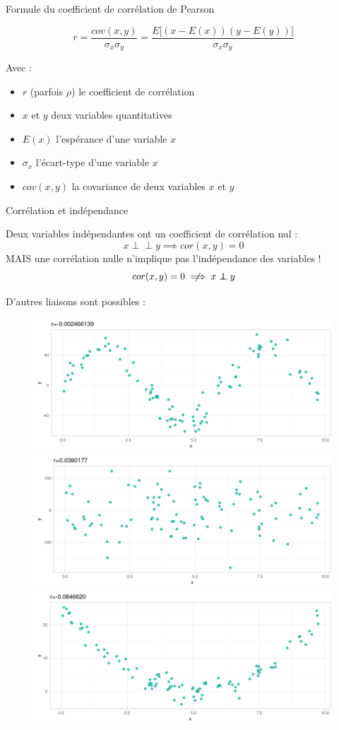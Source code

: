\documentclass{beamer}
\begin{document}
\begin{frame}{Formule du coefficient de corrélation de Pearson }


$$r= \frac{cov(x,y)}{\sigma_x\sigma_y}=\frac{E\big[(x-E(x))(y-E(y))  \big]}{\sigma_x\sigma_y}$$ 

Avec : 

\begin{itemize}
  \item $r$ (parfois $\rho$) le coefficient de corrélation
  \item $x$ et $y$ deux variables quantitatives
  \item $E(x)$ l'espérance d'une variable $x$
  \item $\sigma_x$ l'écart-type  d'une variable $x$
  \item $cov(x,y)$ la covariance  de deux variables  $x$ et $y$
\end{itemize}


\end{frame}





\begin{frame}{Corrélation et indépendance }
\begin{small}
Deux variables indépendantes ont un coefficient de corrélation nul :
$$ x \perp\!\!\!\!\perp y \implies  cor(x,y)=0  $$
MAIS une corrélation nulle n'\alert{implique pas} l'indépendance des variables ! 
$$cor(x,y)=0 \centernot \implies x \perp\!\!\!\!\perp y $$
\end{small}
D'autres liaisons sont possibles : 


\begin{figure}
\includegraphics[width=.32\linewidth]{img/sinus.png}
\includegraphics[width=.33\linewidth]{img/flou.png}
\includegraphics[width=.32\linewidth]{img/quadratic.png}
\end{figure}



\end{frame}
\end{document}
